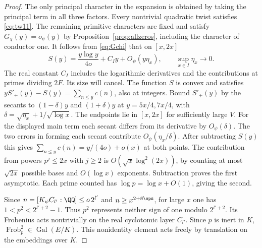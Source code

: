 \documentclass[a4paper,11pt]{article}
\theoremstyle{definition}
\theoremstyle{remark}
\newcommand{\Frob}{\operatorname{Frob}}\newcommand{\Gal}{\operatorname{Gal}}
\numberwithin{equation}{section}
\begin{document}
\begin{proof}
The only principal character in the expansion is obtained by taking
the principal term in all three factors. Every nontrivial quadratic
twist satisfies \eqref{eq:tw11}. The remaining primitive characters
are fixed and satisfy \(G_\chi(y)=o_\psi(y)\) by
Proposition~\ref{prop:allzeros}, including the character of conductor one.
It follows from \eqref{eq:Gchi} that on \([x,2x]\)
\[
       S(y)=\frac{y\log y}{4o}+C_Iy+O_\psi(y\eta_x),
              \qquad \sup_{x\in I}\eta_x\longrightarrow0 .
\]
The real constant \(C_I\) includes the logarithmic derivatives and
the contributions at primes dividing \(2F\). Its size will cancel.
The function \(S\) is convex and satisfies
\(yS'_+(y)-S(y)=\sum_{n\le y}c(n)\), also at integers. Bound
\(S'_+(y)\) by the secants to \((1-\delta)y\) and \((1+\delta)y\)
at \(y=5x/4,7x/4\), with
\(\delta=\sqrt{\eta_x}+1/\sqrt{\log x}\). The endpoints lie in
\([x,2x]\) for sufficiently large \(V\). For the displayed main
term each secant differs from its derivative by \(O_\psi(\delta)\).
The two errors in forming each secant contribute \(O_\psi(\eta_x/\delta)\).
After subtracting \(S(y)\) this gives
\(\sum_{n\le y}c(n)=y/(4o)+o(x)\) at both points. The contribution
from powers \(p^j\le2x\) with \(j\ge2\) is
\(O(\sqrt{x}\log^2(2x))\), by counting at most \(\sqrt{2x}\) possible
bases and \(O(\log x)\) exponents. Subtraction proves the first
asymptotic. Each prime counted has \(\log p=\log x+O(1)\), giving
the second.

Since \(n=[K_\psi C_{l'}:\QQ]\le o\,2^{l'}\) and
\(n\ge x^{2+8\eps}\), for large \(x\) one has
\(1<p^2<2^{l'+2}-1\). Thus \(p^2\) represents neither sign of
one modulo \(2^{l'+2}\). Its Frobenius acts nontrivially on the
real cyclotomic layer \(C_{l'}\). Since \(p\) is inert in \(K\),
\(\Frob_p^2\in\Gal(E/K)\). This nonidentity element acts freely by
translation on the embeddings over \(K\).
\end{proof}
\end{document}
